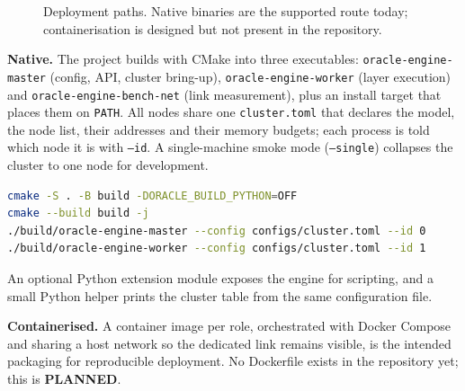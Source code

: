 \documentclass[11pt,a4paper]{article}
\newcommand{\stImp}{\textcolor{ogreen}{\footnotesize\textsf{\textbf{IMPLEMENTED}}}}
\newcommand{\stPlan}{\textcolor{oblue}{\footnotesize\textsf{\textbf{PLANNED}}}}
\begin{document}
\begin{figure}[h]
\centering
{}
\caption{Deployment paths. Native binaries are the supported route today;
containerisation is designed but not present in the repository.}
\label{fig:deploy}
\end{figure}

\textbf{Native.} The project builds with CMake into three executables:
\texttt{oracle-engine-master} (config, API, cluster bring-up),
\texttt{oracle-engine-worker} (layer execution) and
\texttt{oracle-engine-bench-net} (link measurement), plus an install target that
places them on \texttt{PATH}. All nodes share one \texttt{cluster.toml} that
declares the model, the node list, their addresses and their memory budgets;
each process is told which node it is with \texttt{--id}. A single-machine
smoke mode (\texttt{--single}) collapses the cluster to one node for development.

\begin{lstlisting}[language=bash]
cmake -S . -B build -DORACLE_BUILD_PYTHON=OFF
cmake --build build -j
./build/oracle-engine-master --config configs/cluster.toml --id 0
./build/oracle-engine-worker --config configs/cluster.toml --id 1
\end{lstlisting}

An optional Python extension module exposes the engine for scripting, and a small
Python helper prints the cluster table from the same configuration file.

\textbf{Containerised.} A container image per role, orchestrated with Docker
Compose and sharing a host network so the dedicated link remains visible, is the
intended packaging for reproducible deployment. No Dockerfile exists in the
repository yet; this is \stPlan.
\end{document}
